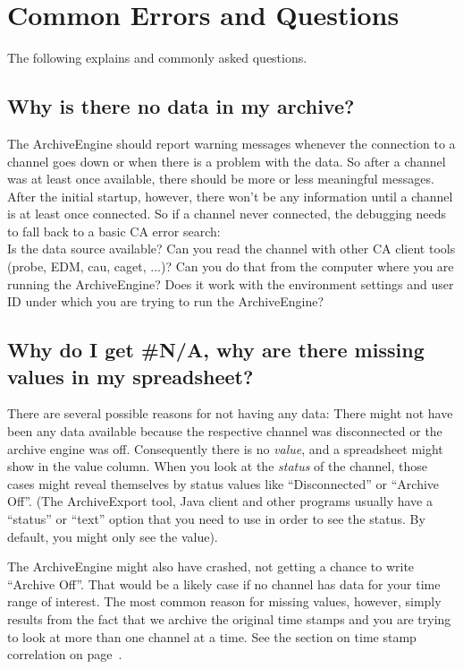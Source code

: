 \chapter{Common Errors and Questions}

The following explains  and commonly
asked questions.

\section{Why is there no data in my archive?}
The ArchiveEngine should report warning messages whenever the
connection to a channel goes down or when there is a problem with the
data. So after a channel was at least once available, there should be
more or less meaningful messages. After the initial startup, however,
there won't be any information until a channel is at least once
connected. So if a channel never connected, the debugging needs to
fall back to a basic CA error search:\\
Is the data source available?
Can you read the channel with other CA client tools
(probe, EDM, cau, caget, ...)?
Can you do that from the computer where you are running
the ArchiveEngine? Does it work with the environment settings and user
ID under which you are trying to run the ArchiveEngine?

\section{Why do I get \#N/A, why are there missing values in my spreadsheet?}
There are several possible reasons for not having any data:
There might not have been any data available because the respective channel was
disconnected or the archive engine was off.
Consequently there is no \emph{value}, and a spreadsheet might show
 in the value column. When you look at the
\emph{status} of the channel, those cases might reveal themselves by status
values like ``Disconnected'' or ``Archive Off''.
(The ArchiveExport tool, Java client and other programs usually have a
``status'' or ``text'' option that you need to use in order to see the
status. By default, you might only see the value).
 
The ArchiveEngine might also have crashed, not getting a chance to
write ``Archive Off''. That would be a likely case if no channel has
data for your time range of interest.
The most common reason for missing values, however, simply results
from the fact that we archive the original time stamps and you are
trying to look at more than one channel at a time. See the section on
time stamp correlation on page~\pageref{sec:timestampcorr}.  

